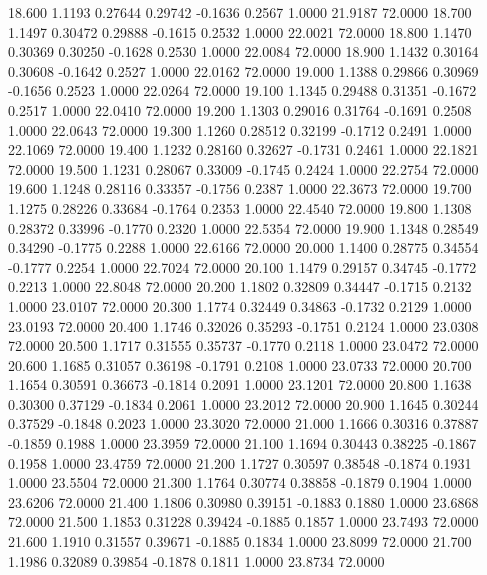   18.600   1.1193   0.27644   0.29742  -0.1636   0.2567   1.0000  21.9187  72.0000
  18.700   1.1497   0.30472   0.29888  -0.1615   0.2532   1.0000  22.0021  72.0000
  18.800   1.1470   0.30369   0.30250  -0.1628   0.2530   1.0000  22.0084  72.0000
  18.900   1.1432   0.30164   0.30608  -0.1642   0.2527   1.0000  22.0162  72.0000
  19.000   1.1388   0.29866   0.30969  -0.1656   0.2523   1.0000  22.0264  72.0000
  19.100   1.1345   0.29488   0.31351  -0.1672   0.2517   1.0000  22.0410  72.0000
  19.200   1.1303   0.29016   0.31764  -0.1691   0.2508   1.0000  22.0643  72.0000
  19.300   1.1260   0.28512   0.32199  -0.1712   0.2491   1.0000  22.1069  72.0000
  19.400   1.1232   0.28160   0.32627  -0.1731   0.2461   1.0000  22.1821  72.0000
  19.500   1.1231   0.28067   0.33009  -0.1745   0.2424   1.0000  22.2754  72.0000
  19.600   1.1248   0.28116   0.33357  -0.1756   0.2387   1.0000  22.3673  72.0000
  19.700   1.1275   0.28226   0.33684  -0.1764   0.2353   1.0000  22.4540  72.0000
  19.800   1.1308   0.28372   0.33996  -0.1770   0.2320   1.0000  22.5354  72.0000
  19.900   1.1348   0.28549   0.34290  -0.1775   0.2288   1.0000  22.6166  72.0000
  20.000   1.1400   0.28775   0.34554  -0.1777   0.2254   1.0000  22.7024  72.0000
  20.100   1.1479   0.29157   0.34745  -0.1772   0.2213   1.0000  22.8048  72.0000
  20.200   1.1802   0.32809   0.34447  -0.1715   0.2132   1.0000  23.0107  72.0000
  20.300   1.1774   0.32449   0.34863  -0.1732   0.2129   1.0000  23.0193  72.0000
  20.400   1.1746   0.32026   0.35293  -0.1751   0.2124   1.0000  23.0308  72.0000
  20.500   1.1717   0.31555   0.35737  -0.1770   0.2118   1.0000  23.0472  72.0000
  20.600   1.1685   0.31057   0.36198  -0.1791   0.2108   1.0000  23.0733  72.0000
  20.700   1.1654   0.30591   0.36673  -0.1814   0.2091   1.0000  23.1201  72.0000
  20.800   1.1638   0.30300   0.37129  -0.1834   0.2061   1.0000  23.2012  72.0000
  20.900   1.1645   0.30244   0.37529  -0.1848   0.2023   1.0000  23.3020  72.0000
  21.000   1.1666   0.30316   0.37887  -0.1859   0.1988   1.0000  23.3959  72.0000
  21.100   1.1694   0.30443   0.38225  -0.1867   0.1958   1.0000  23.4759  72.0000
  21.200   1.1727   0.30597   0.38548  -0.1874   0.1931   1.0000  23.5504  72.0000
  21.300   1.1764   0.30774   0.38858  -0.1879   0.1904   1.0000  23.6206  72.0000
  21.400   1.1806   0.30980   0.39151  -0.1883   0.1880   1.0000  23.6868  72.0000
  21.500   1.1853   0.31228   0.39424  -0.1885   0.1857   1.0000  23.7493  72.0000
  21.600   1.1910   0.31557   0.39671  -0.1885   0.1834   1.0000  23.8099  72.0000
  21.700   1.1986   0.32089   0.39854  -0.1878   0.1811   1.0000  23.8734  72.0000
